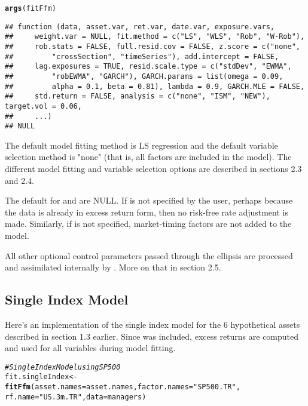 \documentclass[a4paper]{article}\usepackage[]{graphicx}\usepackage[]{color}
\makeatletter
\newcommand{\hlstr}[1]{\textcolor[rgb]{0.192,0.494,0.8}{#1}}%
\newcommand{\hlcom}[1]{\textcolor[rgb]{0.678,0.584,0.686}{\textit{#1}}}%
\newcommand{\hlstd}[1]{\textcolor[rgb]{0.345,0.345,0.345}{#1}}%
\newcommand{\hlkwb}[1]{\textcolor[rgb]{0.69,0.353,0.396}{#1}}%
\newcommand{\hlkwc}[1]{\textcolor[rgb]{0.333,0.667,0.333}{#1}}%
\newcommand{\hlkwd}[1]{\textcolor[rgb]{0.737,0.353,0.396}{\textbf{#1}}}%
\newenvironment{kframe}{%
 \def\at@end@of@kframe{}%
 \ifinner\ifhmode%
  \def\at@end@of@kframe{\end{minipage}}%
  \begin{minipage}{\columnwidth}%
 \fi\fi%
 \def\FrameCommand##1{\hskip\@totalleftmargin \hskip-\fboxsep
 \colorbox{shadecolor}{##1}\hskip-\fboxsep
     \hskip-\linewidth \hskip-\@totalleftmargin \hskip\columnwidth}%
 \MakeFramed {\advance\hsize-\width
   \@totalleftmargin\z@ \linewidth\hsize
   \@setminipage}}%
 {\par\unskip\endMakeFramed%
 \at@end@of@kframe}
\newenvironment{knitrout}{}{} %
\makeatother
\begin{document}
\begin{knitrout}
\color{fgcolor}\begin{kframe}
\begin{alltt}
\hlkwd{args}\hlstd{(fitFfm)}
\end{alltt}
\begin{verbatim}
## function (data, asset.var, ret.var, date.var, exposure.vars, 
##     weight.var = NULL, fit.method = c("LS", "WLS", "Rob", "W-Rob"), 
##     rob.stats = FALSE, full.resid.cov = FALSE, z.score = c("none", 
##         "crossSection", "timeSeries"), add.intercept = FALSE, 
##     lag.exposures = TRUE, resid.scale.type = c("stdDev", "EWMA", 
##         "robEWMA", "GARCH"), GARCH.params = list(omega = 0.09, 
##         alpha = 0.1, beta = 0.81), lambda = 0.9, GARCH.MLE = FALSE, 
##     std.return = FALSE, analysis = c("none", "ISM", "NEW"), target.vol = 0.06, 
##     ...) 
## NULL
\end{verbatim}
\end{kframe}
\end{knitrout}

The default model fitting method is LS regression and the default variable selection method is "none" (that is, all factors are included in the model). The different model fitting and variable selection options are described in sections 2.3 and 2.4.

The default for  and  are NULL. If  is not specified by the user, perhaps because the data is already in excess return form, then no risk-free rate adjustment is made. Similarly, if  is not specified, market-timing factors are not added to the model.

All other optional control parameters passed through the ellipsis are processed and assimilated internally by . More on that in section 2.5.

\subsection{Single Index Model}

Here's an implementation of the single index model for the 6 hypothetical assets described in section 1.3 earlier. Since  was included, excess returns are computed and used for all variables during model fitting. 
\begin{knitrout}
\color{fgcolor}\begin{kframe}
\begin{alltt}
\hlcom{# Single Index Model using SP500}
\hlstd{fit.singleIndex} \hlkwb{<-} \hlkwd{fitFfm}\hlstd{(}\hlkwc{asset.names}\hlstd{=asset.names,} \hlkwc{factor.names}\hlstd{=}\hlstr{"SP500.TR"}\hlstd{,}
                           \hlkwc{rf.name}\hlstd{=}\hlstr{"US.3m.TR"}\hlstd{,} \hlkwc{data}\hlstd{=managers)}
\end{alltt}


{\ttfamily\noindent\bfseries\color{errorcolor}{\#\# Error in is.data.frame(data): object 'managers' not found}}\end{kframe}
\end{knitrout}
\end{document}
